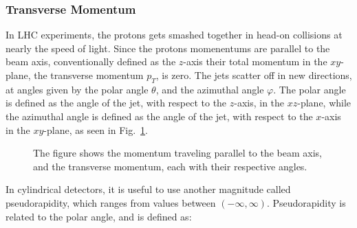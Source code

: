 \documentclass[12pt,a4paper]{article}
\numberwithin{equation}{section}
\begin{document}
\subsubsection{Transverse Momentum}\label{sec:transmomentum}
In LHC experiments, the protons gets smashed together in head-on collisions at
nearly the speed of light. Since the protons momenentums are parallel to the
beam axis, conventionally defined as the $z$-axis their total momentum in the
$xy$-plane, the transverse momentum $p_T$, is zero. The jets scatter off in new
directions, at angles given by the polar angle $\theta$, and the azimuthal angle $\varphi$.
The polar angle is defined as the angle of the jet, with respect to the
$z$-axis, in the $xz$-plane, while the azimuthal angle is defined as the angle
of the jet, with respect to the $x$-axis in the $xy$-plane, as seen in
Fig.~\ref{fig:momentum}.

\begin{figure}[H]
  \centering
  \caption{The figure shows the momentum traveling parallel to the beam axis, and
  the transverse momentum, each with their respective angles.\label{fig:momentum}}
\end{figure}

In cylindrical detectors, it is useful to use another magnitude called
pseudorapidity, which ranges from values between $(-\infty, \infty)$. Pseudorapidity is
related to the polar angle, and is defined as:
\end{document}
